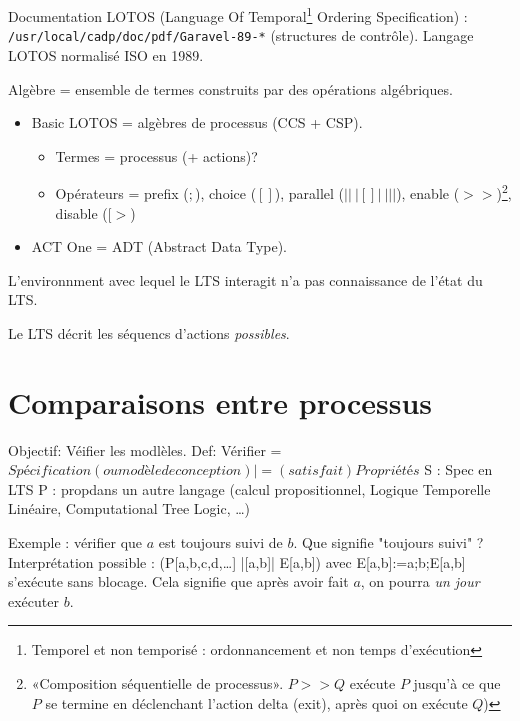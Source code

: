\documentclass[a4paper,french]{article}
\begin{document}
Documentation LOTOS (Language Of Temporal\footnote{Temporel et non temporisé : ordonnancement et non temps d'exécution} Ordering Specification) :
\texttt{/usr/local/cadp/doc/pdf/Garavel-89-*} (structures de contrôle).
Langage LOTOS normalisé ISO en 1989.

Algèbre = ensemble de termes construits par des opérations algébriques.
\begin{itemize}
\item Basic LOTOS = algèbres de processus (CCS + CSP).
\begin{itemize}
\item Termes = processus (+ actions)?
\item Opérateurs = prefix ($;$), choice ($[]$), parallel ($||\ |[]|\  |||$), enable ($>>$)\footnote{«Composition séquentielle de processus». $P >> Q$ exécute $P$ jusqu'à ce que $P$ se termine en déclenchant l'action delta (exit), après quoi on exécute $Q$)}, disable ($[>$)
\end{itemize}
\item ACT One = ADT (Abstract Data Type).
\end{itemize}

%

L'environnment avec lequel le LTS interagit n'a pas connaissance de l'état du LTS.

Le LTS décrit les séquencs d'actions \emph{possibles}.

\section{Comparaisons entre processus}


Objectif: Véifier les modlèles.
Def: Vérifier = $Spécification(ou modèle de conception) |=(satisfait) Propriétés$
S : Spec en LTS
P : propdans un autre langage (calcul propositionnel, Logique Temporelle Linéaire, Computational Tree Logic, \dots)

Exemple : vérifier que $a$ est toujours suivi de $b$. Que signifie "toujours suivi" ?
Interprétation possible : (P[a,b,c,d,\dots] |[a,b]| E[a,b]) avec E[a,b]:=a;b;E[a,b] s'exécute sans blocage. Cela signifie que après avoir fait $a$, on pourra \emph{un jour} exécuter $b$.
\end{document}
